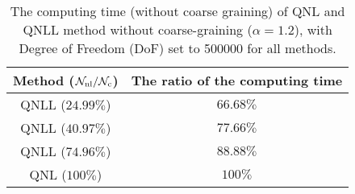 
\begin{table}
	\centering
	\renewcommand{\arraystretch}{1.5} %
	\begin{tabular}{|c|c|} %
		\hline %
		Method ($\mathcal{N}_{{\rm nl}}/\mathcal{N}_{{\rm c}}$) & The ratio of the computing time\\ %
		\hline %
		QNLL ($24.99\%$) & $66.68\%$ \\ %
		QNLL ($40.97\%$) & $77.66\%$ \\ %
		QNLL ($74.96\%$) & $88.88\%$ \\ %
		QNL ($100\%$) & $100\%$ \\ %
		\hline %
	\end{tabular}
	\caption{The computing time (without coarse graining) of QNL and QNLL method without coarse-graining ($\alpha = 1.2$), with Degree of Freedom (DoF) set to 500000 for all methods.}
	\label{tab:computing time alpha12 NCG}
\end{table}

